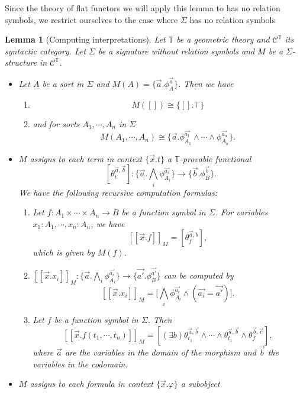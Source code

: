 \documentclass[a4paper]{amsproc}
\theoremstyle{plain}
\newtheorem{lemma}{Lemma}[section]
\theoremstyle{definition}
\theoremstyle{remark}
\numberwithin{equation}{section}
\newcommand{\ldoub}{[\![ }
\newcommand{\rdoub}{]\!]}
\begin{document}
Since the theory of flat functors we will apply this lemma to has no relation symbols, we restrict ourselves to the case where $\Sigma$ has no relation symbols

\begin{lemma} [Computing interpretations] \label{interpretations}
Let $\mathbb{T}$ be a geometric theory and $\mathcal{C}^{\mathbb{T}}$ its syntactic category. Let $\Sigma$ be a signature without relation symbols and $M$ be a $\Sigma$-structure in $\mathcal{C}^{\mathbb{T}}$.
\begin{itemize}
\item Let $A$ be a sort in $\Sigma$ and $M(A) = \{\vec{a} . \phi_A^{\vec{a}}\}$. Then we have
\begin{enumerate}
\item
\[
M([]) \cong \{[] . \top\}
\]
\item and for sorts $A_1, \cdots, A_n$ in $\Sigma$
\[
M(A_1, \cdots, A_n) \cong \{\vec{a} . \phi_{A_1}^{\vec{a_1}} \wedge \cdots \wedge \phi_{A_n}^{\vec{a_n}}\} .
\]
\end{enumerate}
\item $M$ assigns to each term in context $\{\vec{x} . t\}$ a $\mathbb{T}$-provable functional
\[
[\theta_t^{\vec{a}, \vec{b}}]: \big \{ \vec{a} . \bigwedge_i \phi_{A_i}^{\vec{a_i}} \big \} \to \{\vec{b} . \phi_B^{\vec{b}}\} .
\]
We have the following recursive computation formulas:
\begin{enumerate}
\item Let $f: A_1 \times \cdots \times A_n \to B$ be a function symbol in $\Sigma$.  For variables $x_1 :A_1, \cdots, x_n: A_n$, we have
\[
\ldoub \vec{x} . f\rdoub_M = [\theta_f^{\vec{a}, b}] , 
\]
which is given by $M(f)$.
\item $\ldoub\vec{x} . x_i \rdoub_M: \big \{ \vec{a} . \bigwedge_i \phi_{A_i}^{\vec{a_i}} \big \} \to \{\vec{a'} . \phi_B^{\vec{a'}}\}$ can be computed by
\[
\ldoub\vec{x} . x_i \rdoub_M = \big [ \bigwedge_i \phi_{A_i}^{\vec{a_i}} \wedge (\vec{a_i} = \vec{a'})\big ] .
\]
\item Let $f$ be a function symbol in $\Sigma$. Then
\[
\ldoub \vec{x} . f(t_1, \cdots, t_n) \rdoub_M = [(\exists b) \theta_{t_1}^{\vec{a}, \vec{b}} \wedge \cdots \wedge \theta_{t_1}^{\vec{a}, \vec{b}} \wedge \theta_f^{\vec{b}, \vec{c}}],
\]
where $\vec{a}$ are the variables in the domain of the morphism and $\vec{b}$ the variables in the codomain.
\end{enumerate}
\item $M$ assigns to each formula in context $\{\vec{x} . \varphi \}$ a subobject

\end{itemize}
\end{lemma}
\end{document}
